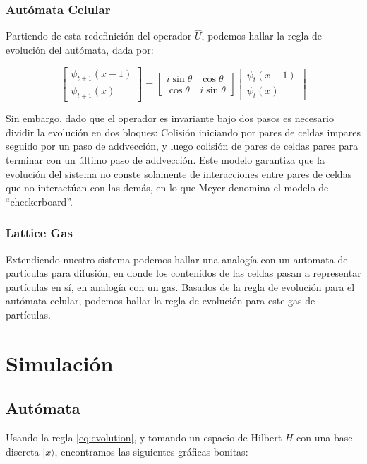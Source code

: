 \documentclass[12pts, letterpaper]{article}
\begin{document}
\subsubsection{Autómata Celular}
Partiendo de esta redefinición del operador $\hat{U}$, podemos hallar la regla de 
evolución del autómata, dada por:

 \begin{equation}\label{eq:evolution}
    \left[ 
    \begin{matrix}
        \psi_{t+1}(x-1) \\
        \psi_{t+1}(x)
    \end{matrix}
    \right] = 
    \begin{bmatrix}
        i\sin\theta & \cos\theta \\
        \cos\theta & i\sin\theta
    \end{bmatrix}
    \left[ 
    \begin{matrix}
        \psi_{t}(x-1) \\
        \psi_{t}(x)
    \end{matrix}
    \right]
\end{equation}

Sin embargo, dado que el operador es invariante bajo dos pasos es necesario dividir la 
evolución en dos bloques: Colisión iniciando por pares de celdas impares seguido por un 
paso de addvección, y luego colisión de pares de celdas pares para terminar con un último 
paso de addvección. Este modelo garantiza que la evolución del sistema no conste solamente 
de interacciones entre pares de celdas que no interactúan con las demás, en lo que Meyer 
denomina el modelo de ``checkerboard''.

\subsubsection{Lattice Gas}
Extendiendo nuestro sistema podemos hallar una analogía con un automata de partículas para
difusión, en donde los contenidos de las celdas pasan a representar partículas en sí, 
en analogía con un gas. Basados de la regla de evolución para el autómata celular, podemos 
hallar la regla de evolución para este gas de partículas.

\section{Simulación}
\subsection{Autómata}
Usando la regla \ref{eq:evolution}, y tomando un espacio de Hilbert $H$ con una base 
discreta $|x\rangle$, encontramos las siguientes gráficas bonitas: 
\end{document}
